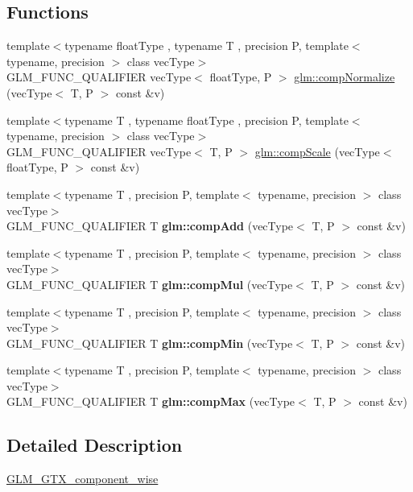 \subsection*{Functions}
\begin{DoxyCompactItemize}
\item 
{\footnotesize template$<$typename float\+Type , typename T , precision P, template$<$ typename, precision $>$ class vec\+Type$>$ }\\G\+L\+M\+\_\+\+F\+U\+N\+C\+\_\+\+Q\+U\+A\+L\+I\+F\+I\+ER vec\+Type$<$ float\+Type, P $>$ \hyperlink{group__gtx__component__wise_gaeb34fdf090d2d4da9babcdfec267f09e}{glm\+::comp\+Normalize} (vec\+Type$<$ T, P $>$ const \&v)
\item 
{\footnotesize template$<$typename T , typename float\+Type , precision P, template$<$ typename, precision $>$ class vec\+Type$>$ }\\G\+L\+M\+\_\+\+F\+U\+N\+C\+\_\+\+Q\+U\+A\+L\+I\+F\+I\+ER vec\+Type$<$ T, P $>$ \hyperlink{group__gtx__component__wise_gaea99a3271016bfd331d9fa7587f3db37}{glm\+::comp\+Scale} (vec\+Type$<$ float\+Type, P $>$ const \&v)
\item 
\mbox{\label{component__wise_8inl_a766b58e13ddfe3140ce22939887aa954}} 
{\footnotesize template$<$typename T , precision P, template$<$ typename, precision $>$ class vec\+Type$>$ }\\G\+L\+M\+\_\+\+F\+U\+N\+C\+\_\+\+Q\+U\+A\+L\+I\+F\+I\+ER T {\bfseries glm\+::comp\+Add} (vec\+Type$<$ T, P $>$ const \&v)
\item 
\mbox{\label{component__wise_8inl_a2b7811672b3a9afce8913dae19548b30}} 
{\footnotesize template$<$typename T , precision P, template$<$ typename, precision $>$ class vec\+Type$>$ }\\G\+L\+M\+\_\+\+F\+U\+N\+C\+\_\+\+Q\+U\+A\+L\+I\+F\+I\+ER T {\bfseries glm\+::comp\+Mul} (vec\+Type$<$ T, P $>$ const \&v)
\item 
\mbox{\label{component__wise_8inl_a1577bdcf5f8b76fb66296ac53fe77fa8}} 
{\footnotesize template$<$typename T , precision P, template$<$ typename, precision $>$ class vec\+Type$>$ }\\G\+L\+M\+\_\+\+F\+U\+N\+C\+\_\+\+Q\+U\+A\+L\+I\+F\+I\+ER T {\bfseries glm\+::comp\+Min} (vec\+Type$<$ T, P $>$ const \&v)
\item 
\mbox{\label{component__wise_8inl_a6d3b715875f887b364a34a7529c8fc1b}} 
{\footnotesize template$<$typename T , precision P, template$<$ typename, precision $>$ class vec\+Type$>$ }\\G\+L\+M\+\_\+\+F\+U\+N\+C\+\_\+\+Q\+U\+A\+L\+I\+F\+I\+ER T {\bfseries glm\+::comp\+Max} (vec\+Type$<$ T, P $>$ const \&v)
\end{DoxyCompactItemize}


\subsection{Detailed Description}
\hyperlink{group__gtx__component__wise}{G\+L\+M\+\_\+\+G\+T\+X\+\_\+component\+\_\+wise} 